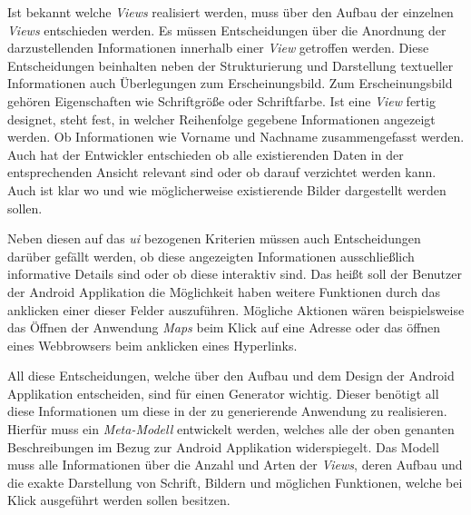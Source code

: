 Ist bekannt welche \textit{Views} realisiert werden, muss über den Aufbau der einzelnen \textit{Views} entschieden werden. Es müssen Entscheidungen über die Anordnung der darzustellenden Informationen innerhalb einer \textit{View} getroffen werden. Diese Entscheidungen beinhalten neben der Strukturierung und Darstellung textueller Informationen auch Überlegungen zum Erscheinungsbild. Zum Erscheinungsbild gehören Eigenschaften wie Schriftgröße oder Schriftfarbe. Ist eine \textit{View} fertig designet, steht fest, in welcher Reihenfolge gegebene Informationen angezeigt werden. Ob Informationen wie Vorname und Nachname zusammengefasst werden. Auch hat der Entwickler entschieden ob alle existierenden Daten in der entsprechenden Ansicht relevant sind oder ob darauf verzichtet werden kann.  Auch ist klar wo und wie möglicherweise existierende Bilder dargestellt werden sollen.

Neben diesen auf das \textit{\acf{ui}} bezogenen Kriterien müssen auch Entscheidungen darüber gefällt werden, ob diese angezeigten Informationen ausschließlich informative Details sind oder ob diese interaktiv sind. Das heißt soll der Benutzer der Android Applikation die Möglichkeit haben weitere Funktionen durch das anklicken einer dieser Felder auszuführen. Mögliche Aktionen wären beispielsweise das Öffnen der Anwendung \textit{Maps} beim Klick auf eine Adresse oder das öffnen eines Webbrowsers beim anklicken eines Hyperlinks. 

All diese Entscheidungen, welche über den Aufbau und dem Design der Android Applikation entscheiden, sind für einen Generator wichtig. Dieser benötigt all diese Informationen um diese in der zu generierende Anwendung zu realisieren. Hierfür muss ein \textit{Meta-Modell} entwickelt werden, welches alle der oben genanten Beschreibungen im Bezug zur Android Applikation widerspiegelt. Das Modell muss alle Informationen über die Anzahl und Arten der \textit{Views}, deren Aufbau und die exakte Darstellung von Schrift, Bildern und möglichen Funktionen, welche bei Klick ausgeführt werden sollen besitzen.

